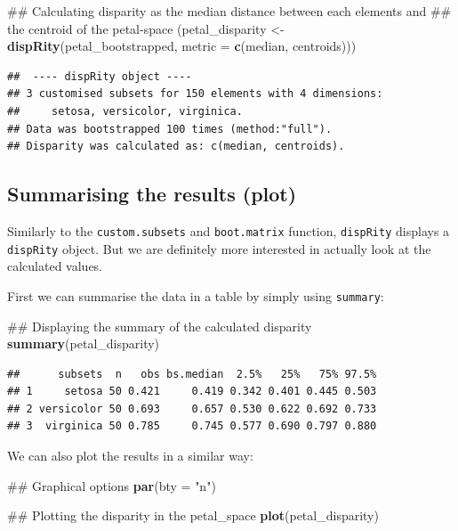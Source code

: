 \documentclass[]{book}
\newenvironment{Shaded}{\begin{snugshade}}{\end{snugshade}}
\newcommand{\KeywordTok}[1]{\textcolor[rgb]{0.13,0.29,0.53}{\textbf{#1}}}
\newcommand{\DataTypeTok}[1]{\textcolor[rgb]{0.13,0.29,0.53}{#1}}
\newcommand{\StringTok}[1]{\textcolor[rgb]{0.31,0.60,0.02}{#1}}
\newcommand{\NormalTok}[1]{#1}
\theoremstyle{definition}
\theoremstyle{definition}
\theoremstyle{definition}
\theoremstyle{remark}
\begin{document}
\begin{Shaded}
\begin{Highlighting}[]
\NormalTok{## Calculating disparity as the median distance between each elements and}
\NormalTok{## the centroid of the petal-space}
\NormalTok{(petal_disparity <-}\StringTok{ }\KeywordTok{dispRity}\NormalTok{(petal_bootstrapped, }\DataTypeTok{metric =} \KeywordTok{c}\NormalTok{(median, centroids)))}
\end{Highlighting}
\end{Shaded}

\begin{verbatim}
##  ---- dispRity object ---- 
## 3 customised subsets for 150 elements with 4 dimensions:
##     setosa, versicolor, virginica.
## Data was bootstrapped 100 times (method:"full").
## Disparity was calculated as: c(median, centroids).
\end{verbatim}

\subsection{Summarising the results
(plot)}\label{summarising-the-results-plot}

Similarly to the \texttt{custom.subsets} and \texttt{boot.matrix}
function, \texttt{dispRity} displays a \texttt{dispRity} object. But we
are definitely more interested in actually look at the calculated
values.

First we can summarise the data in a table by simply using
\texttt{summary}:

\begin{Shaded}
\begin{Highlighting}[]
\NormalTok{## Displaying the summary of the calculated disparity}
\KeywordTok{summary}\NormalTok{(petal_disparity)}
\end{Highlighting}
\end{Shaded}

\begin{verbatim}
##      subsets  n   obs bs.median  2.5%   25%   75% 97.5%
## 1     setosa 50 0.421     0.419 0.342 0.401 0.445 0.503
## 2 versicolor 50 0.693     0.657 0.530 0.622 0.692 0.733
## 3  virginica 50 0.785     0.745 0.577 0.690 0.797 0.880
\end{verbatim}

We can also plot the results in a similar way:

\begin{Shaded}
\begin{Highlighting}[]
\NormalTok{## Graphical options}
\KeywordTok{par}\NormalTok{(}\DataTypeTok{bty =} \StringTok{"n"}\NormalTok{)}

\NormalTok{## Plotting the disparity in the petal_space}
\KeywordTok{plot}\NormalTok{(petal_disparity)}
\end{Highlighting}
\end{Shaded}
\end{document}
